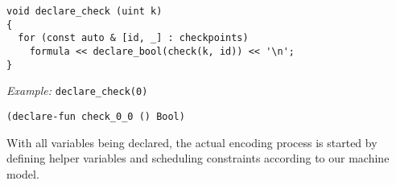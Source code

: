

\begin{lstlisting}[style=c++]
void declare_check (uint k)
{
  for (const auto & [id, _] : checkpoints)
    formula << declare_bool(check(k, id)) << '\n';
}
\end{lstlisting}

\noindent
\emph{Example:} \lstinline[style=c++]{declare_check(0)}

\begin{lstlisting}[language=SMTLib]
(declare-fun check_0_0 () Bool)
\end{lstlisting}

%
%


\noindent
With all variables being declared, the actual encoding process is started by defining helper variables and scheduling constraints according to our machine model.

